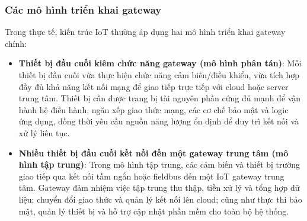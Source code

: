         \subsubsection{Các mô hình triển khai gateway}
            Trong thực tế, kiến trúc IoT thường áp dụng hai mô hình triển khai gateway chính:
            \begin{itemize}
                \item \textbf{Thiết bị đầu cuối kiêm chức năng gateway (mô hình phân tán)}: Mỗi thiết bị đầu cuối vừa thực hiện chức năng cảm biến/điều khiển, vừa tích hợp đầy đủ khả năng kết nối mạng để giao tiếp trực tiếp với cloud hoặc server trung tâm. Thiết bị cần được trang bị tài nguyên phần cứng đủ mạnh để vận hành hệ điều hành, ngăn xếp giao thức mạng, các cơ chế bảo mật và logic ứng dụng, đồng thời yêu cầu nguồn năng lượng ổn định để duy trì kết nối và xử lý liên tục.
                \item \textbf{Nhiều thiết bị đầu cuối kết nối đến một gateway trung tâm (mô hình tập trung)}: Trong mô hình tập trung, các cảm biến và thiết bị trường giao tiếp qua kết nối tầm ngắn hoặc fieldbus đến một IoT gateway trung tâm. Gateway đảm nhiệm việc tập trung thu thập, tiền xử lý và tổng hợp dữ liệu; chuyển đổi giao thức và quản lý kết nối lên cloud; cũng như thực thi bảo mật, quản lý thiết bị và hỗ trợ cập nhật phần mềm cho toàn bộ hệ thống.
            \end{itemize}
    
